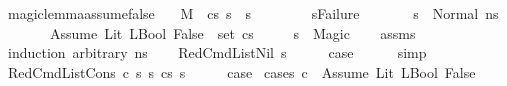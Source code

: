 \begin{isabellebody}
\isanewline
%
\endisadelimproof
\isanewline
{}\isamarkupfalse%
\ magic{\isacharunderscore}{\kern0pt}lemma{\isacharunderscore}{\kern0pt}assume{\isacharunderscore}{\kern0pt}false{\isacharcolon}{\kern0pt}\isanewline
\ \ \ {\isachardoublequoteopen}M{\isacharcomma}{\kern0pt}{\isasymLambda}{\isacharcomma}{\kern0pt}{\isasymGamma}{\isacharcomma}{\kern0pt}{\isasymOmega}\ {\isasymturnstile}\ {\isasymlangle}cs{\isacharcomma}{\kern0pt}\ s{\isasymrangle}\ {\isacharbrackleft}{\kern0pt}{\isasymrightarrow}{\isacharbrackright}{\kern0pt}\ s{\isacharprime}{\kern0pt}{\isachardoublequoteclose}\ \isanewline
\ \ \ \ \ \ \ {\isachardoublequoteopen}s{\isacharprime}{\kern0pt}{\isasymnoteq}Failure{\isachardoublequoteclose}\isanewline
\ \ \ \ \ \ \ {\isachardoublequoteopen}s\ {\isacharequal}{\kern0pt}\ Normal\ ns{\isachardoublequoteclose}\isanewline
\ \ \ \ \ \ \ {\isachardoublequoteopen}{\isacharparenleft}{\kern0pt}Assume\ {\isacharparenleft}{\kern0pt}Lit\ {\isacharparenleft}{\kern0pt}LBool\ False{\isacharparenright}{\kern0pt}{\isacharparenright}{\kern0pt}{\isacharparenright}{\kern0pt}\ {\isasymin}\ set\ {\isacharparenleft}{\kern0pt}cs{\isacharparenright}{\kern0pt}{\isachardoublequoteclose}\isanewline
\ \ \ \ \ {\isachardoublequoteopen}s{\isacharprime}{\kern0pt}\ {\isacharequal}{\kern0pt}\ Magic{\isachardoublequoteclose}\isanewline
%
\isadelimproof
\ \ %
\endisadelimproof
%
\isatagproof
{}\isamarkupfalse%
\ assms\isanewline
{}\isamarkupfalse%
\ {\isacharparenleft}{\kern0pt}induction\ arbitrary{\isacharcolon}{\kern0pt}\ ns{\isacharparenright}{\kern0pt}\isanewline
\ \ \isamarkupfalse%
\ {\isacharparenleft}{\kern0pt}RedCmdListNil\ s{\isacharparenright}{\kern0pt}\isanewline
\ \ \isamarkupfalse%
\ \isamarkupfalse%
\ {\isacharquery}{\kern0pt}case\isanewline
\ \ \ \ \isamarkupfalse%
\ simp\isanewline
{}\isamarkupfalse%
\isanewline
\ \ \isamarkupfalse%
\ {\isacharparenleft}{\kern0pt}RedCmdListCons\ c\ s\ s{\isacharprime}{\kern0pt}{\isacharprime}{\kern0pt}\ cs\ s{\isacharprime}{\kern0pt}{\isacharparenright}{\kern0pt}\isanewline
\ \ \isamarkupfalse%
\ \isamarkupfalse%
\ {\isacharquery}{\kern0pt}case\isanewline
{}\isamarkupfalse%
\ {\isacharparenleft}{\kern0pt}cases\ {\isachardoublequoteopen}c\ {\isacharequal}{\kern0pt}\ {\isacharparenleft}{\kern0pt}Assume\ {\isacharparenleft}{\kern0pt}Lit\ {\isacharparenleft}{\kern0pt}LBool\ False{\isacharparenright}{\kern0pt}{\isacharparenright}{\kern0pt}{\isacharparenright}{\kern0pt}{\isachardoublequoteclose}{\isacharparenright}{\kern0pt}\isanewline

\end{isabellebody}
